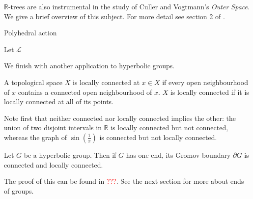 $\mathbb{R}$-trees are also instrumental in the study of Culler and Vogtmann's \textit{Outer Space}. We give a brief overview of this subject. For more detail see section 2 of \cite{Shalen}.

\begin{definition}
    Polyhedral action
\end{definition}

Let $\mathcal{L}$

We finish with another application to hyperbolic groups.
\begin{definition}
    A topological space $X$ is \textnormal{locally connected} at $x\in X$ if every open neighbourhood of $x$ contains a connected open neighbourhood of $x$. $X$ is locally connected if it is locally connected at all of its points.
\end{definition}
Note first that neither connected nor locally connected implies the other: the union of two disjoint intervals in $\mathbb{R}$ is locally connected but not connected, whereas the graph of $\sin(\frac{1}{x})$ is connected but not locally connected.

\begin{theorem}
    Let $G$ be a hyperbolic group. Then if $G$ has one end, its Gromov boundary $\partial G$ is connected and locally connected.
\end{theorem}

The proof of this can be found in \textcolor{red}{???}. See the next section for more about ends of groups.




